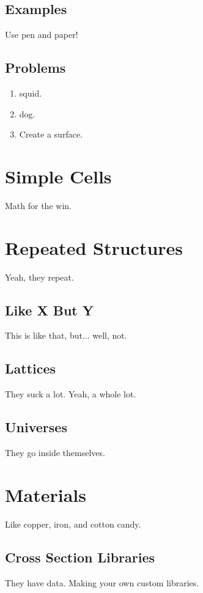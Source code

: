 \documentclass[10pt,a4paper]{book}
\begin{document}
\section{Examples}
Use pen and paper!

\section*{Problems}

\begin{enumerate}
\item squid.

\item dog.

\item Create a surface.

\end{enumerate}

\chapter{Simple Cells}
Math for the win.

\chapter{Repeated Structures}
Yeah, they repeat.

\section{Like X But Y}
This is like that, but... well, not.

\section{Lattices}
They suck a lot. Yeah, a whole lot.

\section{Universes}
They go inside themselves.

\chapter{Materials}
Like copper, iron, and cotton candy.

\section{Cross Section Libraries}
They have data. Making your own custom libraries.
\end{document}
